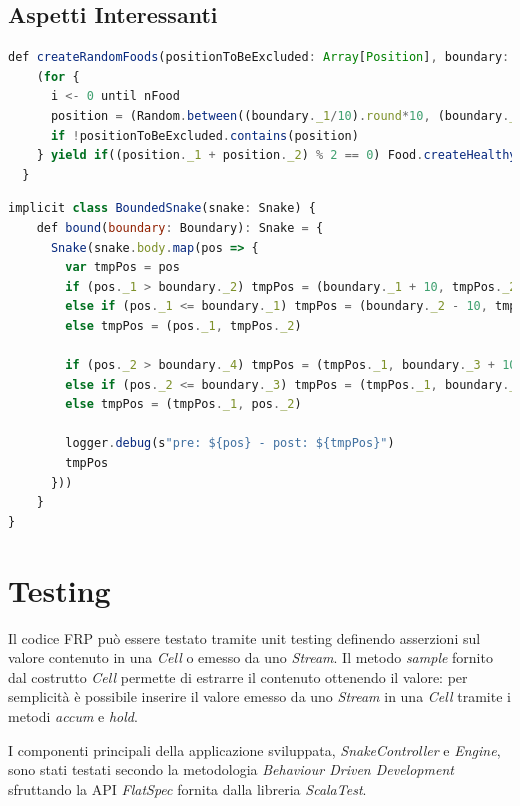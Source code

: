 \documentclass[../main.tex]{subfiles}
\begin{document}
\subsection{Aspetti Interessanti}
\begin{lstlisting}[language=Javascript, caption=Generazione random delle entità "Food" tramite for-comprehension.]
def createRandomFoods(positionToBeExcluded: Array[Position], boundary: Boundary, nFood: Int): Array[Food] = {
    (for {
      i <- 0 until nFood
      position = (Random.between((boundary._1/10).round*10, (boundary._2/10).round*10), Random.between((boundary._3/10).round*10, (boundary._4/10)*10))
      if !positionToBeExcluded.contains(position)
    } yield if((position._1 + position._2) % 2 == 0) Food.createHealthyFood(position) else Food.createJunkFood(position)).toArray
  }
\end{lstlisting}

\begin{lstlisting}[language=Javascript, caption=Pimp My Library pattern - Aggiunta feature all'entità \textit{Snake} per vincolare il movimento all'interno del "mondo" di gioco.]
implicit class BoundedSnake(snake: Snake) {
    def bound(boundary: Boundary): Snake = {
      Snake(snake.body.map(pos => {
        var tmpPos = pos
        if (pos._1 > boundary._2) tmpPos = (boundary._1 + 10, tmpPos._2)
        else if (pos._1 <= boundary._1) tmpPos = (boundary._2 - 10, tmpPos._2)
        else tmpPos = (pos._1, tmpPos._2)
    
        if (pos._2 > boundary._4) tmpPos = (tmpPos._1, boundary._3 + 10)
        else if (pos._2 <= boundary._3) tmpPos = (tmpPos._1, boundary._4 - 10)
        else tmpPos = (tmpPos._1, pos._2)
    
        logger.debug(s"pre: ${pos} - post: ${tmpPos}")
        tmpPos
      }))
    }
}
\end{lstlisting}

\section{Testing}
Il codice FRP può essere testato tramite unit testing definendo asserzioni sul valore contenuto in una \textit{Cell} o emesso da uno \textit{Stream}. Il metodo \textit{sample} fornito dal costrutto \textit{Cell} permette di estrarre il contenuto ottenendo il valore: per semplicità è possibile inserire il valore emesso da uno \textit{Stream} in una \textit{Cell} tramite i metodi \textit{accum} e \textit{hold}.

I componenti principali della applicazione sviluppata, \textit{SnakeController} e \textit{Engine}, sono stati testati secondo la metodologia \textit{Behaviour Driven Development} sfruttando la API \textit{FlatSpec} fornita dalla libreria \textit{ScalaTest}.
\end{document}
